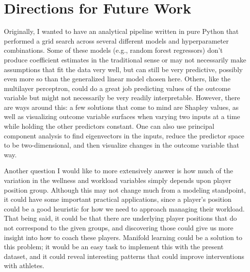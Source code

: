 \documentclass{article}
\begin{document}
	\section{Directions for Future Work}

		Originally, I wanted to have an analytical pipeline written in pure Python
		that performed
		a grid search across several different models and hyperparameter combinations.
		Some of these models (e.g., random forest regressors) don't produce coefficient
		estimates in the traditional sense or may not necessarily make assumptions that
		fit the data very well, but can still be very predictive, possibly even
		more so than the generalized linear model chosen here. Others, like the
		multilayer perceptron, could do a great job predicting values of the
		outcome variable but might not necessarily be very readily interpretable.
		However, there are ways around this: a few solutions that come to mind are
		Shapley values, as well as visualizing outcome variable surfaces when varying
		two inputs at a time while holding the other predictors constant. One can
		also use principal component analysis to find eigenvectors in the inputs,
		reduce the predictor space to be two-dimensional, and then visualize
		changes in the outcome variable that way.

		Another question I would like to more extensively answer is how much of
		the variation in the wellness and workload variables simply depends upon
		player position group. Although this may not change much from a modeling
		standpoint, it could have some important practical applications, since a
		player's position could be a good heuristic for how we need to approach
		managing their workload. That being said, it could be that there are
		underlying player positions that do not correspond to the given groups,
		and discovering those could give us more insight into how to coach these
		players. Manifold learning could be a solution to this problem; it would
		be an easy task to implement this with the present dataset, and it could
		reveal interesting patterns that could improve interventions with athletes.
\end{document}
